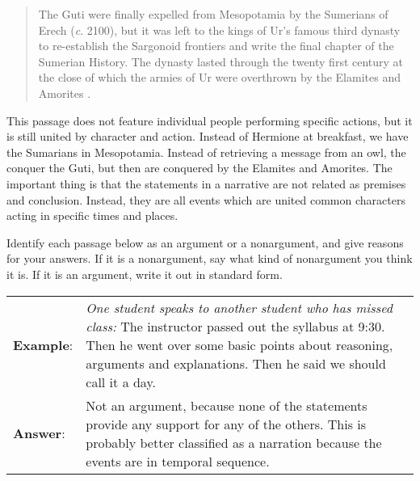 \begin{quotation}\noindent The Guti were finally expelled from Mesopotamia by the Sumerians of Erech (\textit{c}. 2100), but it was left to the kings of Ur's famous third dynasty to re-establish the Sargonoid frontiers and write the final chapter of the Sumerian History. The dynasty lasted through the twenty first century at the close of which the armies of Ur were overthrown by the Elamites and Amorites \citep{McEvedy1967}. \end{quotation} 

This passage does not feature individual people performing specific actions, but it is still united by character and action. Instead of Hermione at breakfast, we have the Sumarians in Mesopotamia. Instead of retrieving a message from an owl, the conquer the Guti, but then are conquered by the Elamites and Amorites. The important thing is that the statements in a narrative are not related as premises and conclusion. Instead, they are all events which are united common characters acting in specific times and places. 


\practiceproblems
\problempart Identify each passage below as an argument or a nonargument, and give reasons for your answers. If it is a nonargument, say what kind of nonargument you think it is. If it is an argument, write it out in standard form.

\begin{longtabu}{p{.1\linewidth}p{.9\linewidth}}
\textbf{Example}: & \textit{One student speaks to another student who has missed class:} The instructor passed out the syllabus at 9:30. Then he went over some basic points about reasoning, arguments and explanations. Then he said we should call it a day. \\
\textbf{Answer}: & Not an argument, because none of the statements provide any support for any of the others. This is probably better classified as a narration because the events are in temporal sequence. \\
\end{longtabu}

